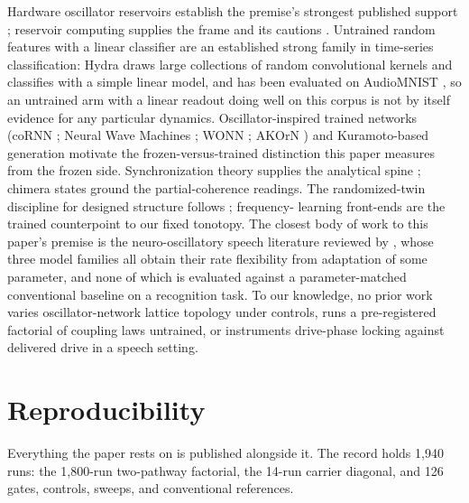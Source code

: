 \documentclass{article}
\makeatletter
\newcounter{none} %
\newcommand{\iclr@floatbarrier}{\par\vspace{\z@}%
  \ifx\@deferlist\@empty\else\clearpage\fi}
\let\iclr@section\section
\renewcommand{\section}{\iclr@floatbarrier\iclr@section}
\makeatother
\begin{document}
Hardware oscillator reservoirs establish the premise's strongest
published support \citep{torrejon2017}; reservoir computing supplies the
frame and its cautions
\citep{jaeger2001, maass2002, lukosevicius2012, tanaka2019}. Untrained
random features with a linear classifier are an established strong
family in time-series classification: Hydra draws large collections of
random convolutional kernels and classifies with a simple linear model,
and has been evaluated on AudioMNIST \citep{saadatmand2026}, so an
untrained arm with a linear readout doing well on this corpus is not by
itself evidence for any particular dynamics. Oscillator-inspired trained
networks (coRNN \citep{rusch2021}; Neural Wave Machines
\citep{keller2023}; WONN \citep{dai2026}; AKOrN \citep{miyato2025}) and
Kuramoto-based generation \citep{unconv-ai2026} motivate the
frozen-versus-trained distinction this paper measures from the frozen
side. Synchronization theory supplies the analytical spine
\citep{winfree1967, kuramoto1975, sakaguchi1986, adler1946, pikovsky2001, strogatz2000};
chimera states \citep{kuramoto2002, abrams2004} ground the
partial-coherence readings. The randomized-twin discipline for designed
structure follows \citep{caranzano}; frequency- learning front-ends
\citep{lostanlen, zeghidour} are the trained counterpoint to our fixed
tonotopy. The closest body of work to this paper's premise is the
neuro-oscillatory speech literature reviewed by \citet{dogonasheva2026},
whose three model families
\citep{assaneo2020, doelling2023, pittman-polletta2021} all obtain their
rate flexibility from adaptation of some parameter, and none of which is
evaluated against a parameter-matched conventional baseline on a
recognition task. To our knowledge, no prior work varies
oscillator-network lattice topology under controls, runs a
pre-registered factorial of coupling laws untrained, or instruments
drive-phase locking against delivered drive in a speech setting.

\section{Reproducibility}\label{reproducibility}

Everything the paper rests on is published alongside it. The record
holds 1,940 runs: the 1,800-run two-pathway factorial, the 14-run
carrier diagonal, and 126 gates, controls, sweeps, and conventional
references.
\end{document}
